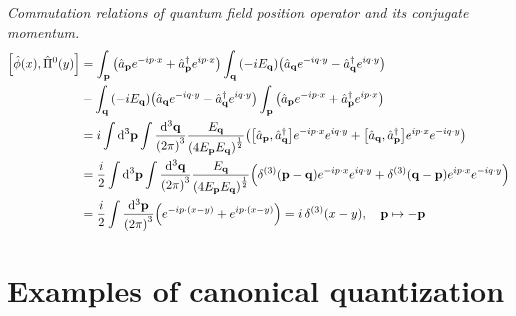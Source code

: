 \documentclass{report}
\begin{document}
\begin{subquests}
	\item \emph{Commutation relations of quantum field position operator and its conjugate momentum.} 
	\begin{align*}
		\bqty{\hat{\phi}(x),\hat{\Pi}^0(y)} & = \int_{\vb p} \pqty{\hat{a}_{\vb p}e^{-i p \cdot x} + \hat{a}^{\dagger}_{\vb p}e^{i p \cdot x}}\int _{\vb q}\pqty{-iE_{\vb q}}\pqty{\hat{a}_{\vb q}e^{-i q \cdot y} - \hat{a}^{\dagger}_{\vb q}e^{i q \cdot y}} \\
		& -\int _{\vb q}\pqty{-iE_{\vb q}}\pqty{\hat{a}_{\vb q}e^{-i q \cdot y} - \hat{a}^{\dagger}_{\vb q}e^{i q \cdot y}}\int_{\vb p} \pqty{\hat{a}_{\vb p}e^{-i p \cdot x} + \hat{a}^{\dagger}_{\vb p}e^{i p \cdot x}} \\
		& = i\int \dd^3{\vb p}\int \frac{\dd^3{\vb q}}{\pqty{2\pi}^3}\frac{E_{\vb q}}{\pqty{4E_{\vb p}E_{\vb q}}^{\frac{1}{2}}}\pqty{\bqty{\hat{a}_{\vb p},\hat{a}^{\dagger}_{\vb q}}e^{-i p \cdot x}e^{i q \cdot y} + \bqty{\hat{a}_{\vb q},\hat{a}^{\dagger}_{\vb p}}e^{i p \cdot x}e^{-i q \cdot y}} \\
		& = \frac{i}{2}\int \dd^3{\vb p}\int \frac{\dd^3{\vb q}}{\pqty{2\pi}^3}\frac{E_{\vb q}}{\pqty{4E_{\vb p}E_{\vb q}}^{\frac{1}{2}}}\pqty{\delta^{(3)}\pqty{\vb p - \vb q}e^{-i p \cdot x}e^{i q \cdot y} + \delta^{(3)}\pqty{\vb q - \vb p}e^{i p \cdot x}e^{-i q \cdot y}} \\
		& = \frac{i}{2}\int\frac{\dd^3{\vb p}}{\pqty{2\pi}^3}\pqty{e^{-i p \cdot (x-y)} + e^{i p \cdot (x-y)}} = i\,\delta^{(3)}(x - y), \quad \vb p \mapsto -\vb p
	\end{align*}
\end{subquests}

\chapter{Examples of canonical quantization}
\end{document}
